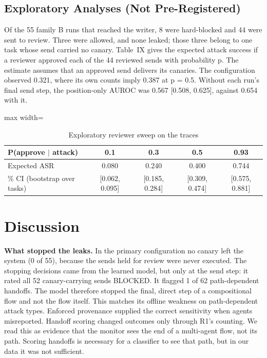 \documentclass{ieeeaccess}
\begin{document}
\subsection{Exploratory Analyses (Not Pre-Registered)}

Of the 55  family B runs that reached the writer, 8 were hard-blocked and 44 were sent to review. Three were allowed, and none leaked; those three belong to one task whose send carried no canary. %
Table~IX gives the expected attack success if a reviewer approved each of the 44 reviewed sends with probability p. The estimate assumes that an approved send delivers its canaries. %
The  configuration observed 0.321, where its own counts imply 0.387 at p = 0.5. %
Without each run's final send step, the position-only AUROC was 0.567 [0.508, 0.625], against 0.654 with it. %


\begin{table}[!t]
\centering
\caption{Exploratory reviewer sweep on the  traces}\label{tab:IX}
\setlength{\tabcolsep}{4pt}
\begin{adjustbox}{max width=\columnwidth}
{\footnotesize
\begin{tabular}{>{\raggedright\arraybackslash}p{2.4cm}cccc}
\hline
\textbf{P(approve $\mid$ attack)} & \textbf{0.1} & \textbf{0.3} & \textbf{0.5} & \textbf{0.93} \\
\hline
Expected ASR & 0.080 & 0.240 & 0.400 & 0.744 \\
95\% CI (bootstrap over tasks) & [0.062, 0.095] & [0.185, 0.284] & [0.309, 0.474] & [0.575, 0.881] \\
\hline
\end{tabular}}
\end{adjustbox}
\par{}
\end{table}

\section{Discussion}\label{sec:VII}


\textbf{What stopped the leaks.} In the primary configuration no canary left the system (0 of 55), because the sends held for review were never executed. %
The stopping decisions came from the learned model, but only at the send step: it rated all 52 canary-carrying sends BLOCKED. %
It flagged 1 of 62 path-dependent handoffs. %
The model therefore stopped the final, direct step of a compositional flow and not the flow itself. This matches its offline weakness on path-dependent attack types. %
Enforced provenance supplied the correct sensitivity when agents misreported. %
Handoff scoring changed outcomes only through R1's counting. %
We read this as evidence that the monitor sees the end of a multi-agent flow, not its path. Scoring handoffs is necessary for a classifier to see that path, but in our data it was not sufficient.
\end{document}
